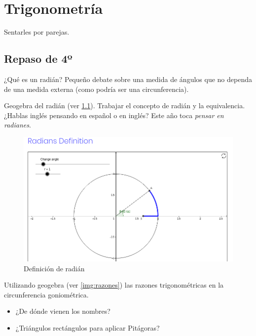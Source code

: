 

\chapter{Trigonometría}

Sentarles por parejas.

\section{Repaso de 4º}

¿Qué es un radián? Pequeño debate sobre una medida de ángulos que no dependa de una medida externa (como podría ser una circunferencia).

Geogebra del radián (ver \ref{img:radian}). Trabajar el concepto de radián y la equivalencia. ¿Hablas inglés pensando en español o en inglés? Este año toca \textit{pensar en radianes}.

\begin{figure}
\centering
\includegraphics[scale=0.5]{img/Trigon1}
\caption{Definición de radián}
\label{img:radian}
\end{figure}

Utilizando geogebra (ver \ref{img:razones}) las razones trigonométricas en la circunferencia goniométrica. 
\begin{itemize}
	\item ¿De dónde vienen los nombres? 
	\item ¿Triángulos rectángulos para aplicar Pitágoras?
\end{itemize}

